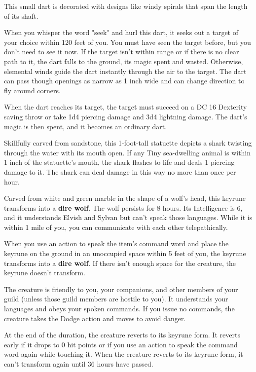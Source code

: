 \documentclass[10pt,a4paper,twoside,bg=print,twocolumn,openany,nodeprecatedcode]{dndbook}
\begin{document}
This small dart is decorated with designs like windy spirals that span the length of its shaft.

When you whisper the word "seek" and hurl this dart, it seeks out a target of your choice within 120 feet of you. You must have seen the target before, but you don't need to see it now. If the target isn't within range or if there is no clear path to it, the dart falls to the ground, its magic spent and wasted. Otherwise, elemental winds guide the dart instantly through the air to the target. The dart can pass though openings as narrow as 1 inch wide and can change direction to fly around corners.

When the dart reaches its target, the target must succeed on a DC 16 Dexterity saving throw or take 1d4 piercing damage and 3d4 lightning damage. The dart's magic is then spent, and it becomes an ordinary dart.

Skillfully carved from sandstone, this 1-foot-tall statuette depicts a shark twisting through the water with its mouth open. If any Tiny sea-dwelling animal is within 1 inch of the statuette's mouth, the shark flashes to life and deals 1 piercing damage to it. The shark can deal damage in this way no more than once per hour.

Carved from white and green marble in the shape of a wolf's head, this keyrune transforms into a \textbf{dire wolf}. The wolf persists for 8 hours. Its Intelligence is 6, and it understands Elvish and Sylvan but can't speak those languages. While it is within 1 mile of you, you can communicate with each other telepathically.

When you use an action to speak the item's command word and place the keyrune on the ground in an unoccupied space within 5 feet of you, the keyrune transforms into a \textbf{dire wolf}. If there isn't enough space for the creature, the keyrune doesn't transform.

The creature is friendly to you, your companions, and other members of your guild (unless those guild members are hostile to you). It understands your languages and obeys your spoken commands. If you issue no commands, the creature takes the Dodge action and moves to avoid danger.

At the end of the duration, the creature reverts to its keyrune form. It reverts early if it drops to 0 hit points or if you use an action to speak the command word again while touching it. When the creature reverts to its keyrune form, it can't transform again until 36 hours have passed.
\end{document}
